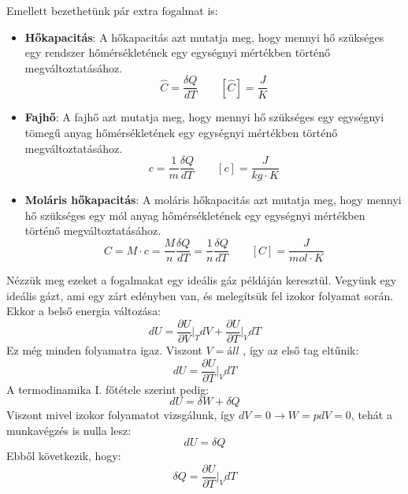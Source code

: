 \documentclass[a4paper,12pt]{article}
\begin{document}
Emellett bezethetünk pár extra fogalmat is:
\begin{itemize}
    \item \textbf{Hőkapacitás}: A hőkapacitás azt mutatja meg, hogy mennyi hő szükséges egy rendszer hőmérsékletének egy egységnyi mértékben történő megváltoztatásához.
    \begin{equation}
        \hat{C} = \frac{\delta Q}{dT} \qquad \left[\hat{C}\right] = \frac{J}{K}
    \end{equation}
    \item \textbf{Fajhő}: A fajhő azt mutatja meg, hogy mennyi hő szükséges egy egységnyi tömegű anyag hőmérsékletének egy egységnyi mértékben történő megváltoztatásához.
    \begin{equation}
        c = \frac{1}{m} \frac{\delta Q}{dT} \qquad \left[c\right] = \frac{J}{kg \cdot K}
    \end{equation}
    \item \textbf{Moláris hőkapacitás}: A moláris hőkapacitás azt mutatja meg, hogy mennyi hő szükséges egy mól anyag hőmérsékletének egy egységnyi mértékben történő megváltoztatásához.
    \begin{equation}
        C = M \cdot c = \frac{M}{n} \frac{\delta Q}{dT} = \frac{1}{n} \frac{\delta Q}{dT} \qquad \left[C\right] = \frac{J}{mol \cdot K}
    \end{equation}
\end{itemize}
Nézzük meg ezeket a fogalmakat egy ideális gáz példáján keresztül. Vegyünk egy ideális gázt, ami egy zárt edényben van, és melegítsük fel izokor folyamat során.
Ekkor a belső energia változása:
\begin{equation}
    dU = \frac{\partial U}{\partial V}\bigg|_{T} dV + \frac{\partial U}{\partial T}\bigg|_{V} dT
\end{equation}
Ez még minden folyamatra igaz. Viszont $V = áll$ , így az első tag eltűnik: 
\begin{equation}
    dU = \frac{\partial U}{\partial T}\bigg|_{V} dT
\end{equation}
A termodinamika I. főtétele szerint pedig:
\begin{equation}
    dU = \delta W + \delta Q
\end{equation}
Viszont mivel izokor folyamatot vizsgálunk, így $dV = 0 \to W = pdV = 0$, tehát a munkavégzés is nulla lesz:
\begin{equation}
    dU = \delta Q
\end{equation}
Ebből következik, hogy:
\begin{equation}
    \delta Q = \frac{\partial U}{\partial T}\bigg|_{V} dT
\end{equation}
\end{document}
